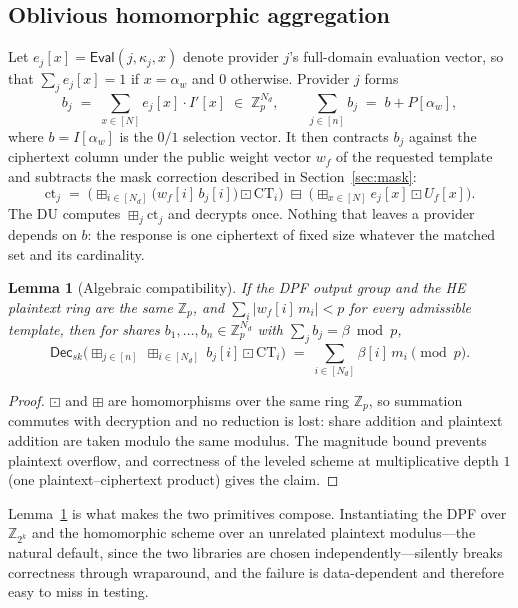 \documentclass[journal]{IEEEtran}
\newtheorem{lemma}{Lemma}
\newcommand{\Eval}{\mathsf{Eval}}
\newcommand{\Dec}{\mathsf{Dec}}
\newcommand{\bplus}{\boxplus}
\newcommand{\bminus}{\boxminus}
\newcommand{\bdot}{\boxdot}
\begin{document}
\subsection{Oblivious homomorphic aggregation}
\label{sec:oha}
Let $e_j[x]=\Eval(j,\kappa_j,x)$ denote provider $j$'s full-domain evaluation vector, so that $\sum_j e_j[x]=1$ if $x=\alpha_w$ and $0$ otherwise. Provider $j$ forms
\[
b_j \;=\; \sum_{x\in[N]} e_j[x]\cdot I'[x] \;\in\;\mathbb{Z}_p^{N_d},
\qquad \sum_{j\in[n]} b_j \;=\; b + P[\alpha_w],
\]
where $b=I[\alpha_w]$ is the $0/1$ selection vector. It then contracts $b_j$ against the ciphertext column under the public weight vector $w_f$ of the requested template and subtracts the mask correction described in Section~\ref{sec:mask}:
\[
\text{ct}_j \;=\; \Big(\bplus_{i\in[N_d]} \big(w_f[i]\,b_j[i]\big)\bdot \text{CT}_i\Big) \;\bminus\; \Big(\bplus_{x\in[N]} e_j[x]\bdot U_f[x]\Big).
\]
The DU computes $\bplus_j \text{ct}_j$ and decrypts once. Nothing that leaves a provider depends on $b$: the response is one ciphertext of fixed size whatever the matched set and its cardinality.

\begin{lemma}[Algebraic compatibility]
\label{lem:compat}
If the DPF output group and the HE plaintext ring are the same $\mathbb{Z}_p$, and $\sum_{i}|w_f[i]\,m_i| < p$ for every admissible template, then for shares $b_1,\dots,b_n\in\mathbb{Z}_p^{N_d}$ with $\sum_j b_j = \beta \bmod p$,
\[
\Dec_{sk}\Big(\bplus_{j\in[n]}\ \bplus_{i\in[N_d]}\ b_j[i]\bdot \text{CT}_i\Big) \;=\; \sum_{i\in[N_d]} \beta[i]\,m_i \pmod p .
\]
\end{lemma}
\begin{proof}
$\bdot$ and $\bplus$ are homomorphisms over the same ring $\mathbb{Z}_p$, so summation commutes with decryption and no reduction is lost: share addition and plaintext addition are taken modulo the same modulus. The magnitude bound prevents plaintext overflow, and correctness of the leveled scheme at multiplicative depth $1$ (one plaintext--ciphertext product) gives the claim.
\end{proof}

Lemma~\ref{lem:compat} is what makes the two primitives compose. Instantiating the DPF over $\mathbb{Z}_{2^k}$ and the homomorphic scheme over an unrelated plaintext modulus---the natural default, since the two libraries are chosen independently---silently breaks correctness through wraparound, and the failure is data-dependent and therefore easy to miss in testing.
\end{document}
